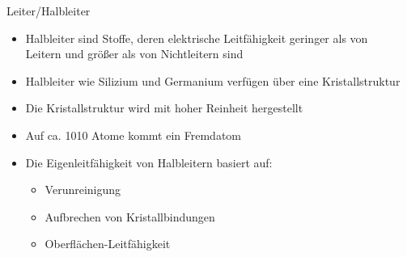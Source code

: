 \documentclass[12pt%
,aspectratio=169%
]{beamer}
\begin{document}
\begin{frame}{Leiter/Halbleiter}
	\begin{itemize}
		\item Halbleiter sind Stoffe, deren elektrische Leitfähigkeit geringer als von\\
		Leitern und größer als von Nichtleitern sind
		\item Halbleiter wie Silizium und Germanium verfügen über eine Kristallstruktur
		\item Die Kristallstruktur wird mit hoher Reinheit hergestellt
		\item Auf ca. 1010 Atome kommt ein Fremdatom
		\item Die Eigenleitfähigkeit von Halbleitern basiert auf:
		\begin{itemize}
			\item Verunreinigung
			\item Aufbrechen von Kristallbindungen
			\item Oberflächen-Leitfähigkeit
		\end{itemize}

	\end{itemize}
\end{frame}
\end{document}

